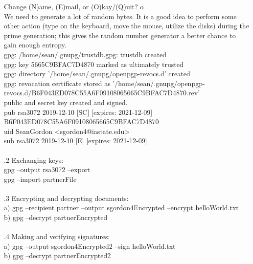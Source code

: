 \documentclass[12pt]{article}
\begin{document}
\noindent Change (N)ame, (E)mail, or (O)kay/(Q)uit? o\\

\noindent We need to generate a lot of random bytes. It is a good idea to perform some other action (type on the keyboard, move the mouse, utilize the disks) during the prime generation; this gives the random number generator a better chance to gain enough entropy.\\
gpg: /home/sean/.gnupg/trustdb.gpg: trustdb created\\
gpg: key 5665C9BFAC7D4870 marked as ultimately trusted\\
gpg: directory '/home/sean/.gnupg/openpgp-revocs.d' created\\
gpg: revocation certificate stored as '/home/sean/.gnupg/openpgp-revocs.d/B6F043ED078C55A6F09108065665C9BFAC7D4870.rev'\\
public and secret key created and signed.\\

\noindent pub   rsa3072 2019-12-10 [SC] [expires: 2021-12-09]\\
\indent B6F043ED078C55A6F09108065665C9BFAC7D4870\\
uid                      SeanGordon <sgordon4@iastate.edu>\\
sub   rsa3072 2019-12-10 [E] [expires: 2021-12-09]\\

\hrulefill\\

.2 Exchanging keys:\\

gpg --output rsa3072 --export\\
\indent gpg --import partnerFile\\

\hrulefill\\

.3 Encrypting and decrypting documents:\\

a) gpg --recipient partner --output sgordon4Encrypted --encrypt helloWorld.txt\\

b) gpg --decrypt partnerEncrypted\\

\hrulefill\\

.4 Making and verifying signatures:\\

a) gpg --output sgordon4Encrypted2 --sign helloWorld.txt\\

b) gpg --decrypt partnerEncrypted2
\end{document}
